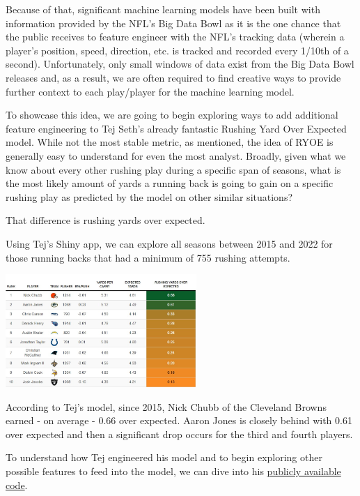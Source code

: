 \documentclass[
  letterpaper,
]{krantz}
\begin{document}
Because of that, significant machine learning models have been built
with information provided by the NFL's Big Data Bowl as it is the one
chance that the public receives to feature engineer with the NFL's
tracking data (wherein a player's position, speed, direction, etc. is
tracked and recorded every 1/10th of a second). Unfortunately, only
small windows of data exist from the Big Data Bowl releases and, as a
result, we are often required to find creative ways to provide further
context to each play/player for the machine learning model.

To showcase this idea, we are going to begin exploring ways to add
additional feature engineering to Tej Seth's already fantastic Rushing
Yard Over Expected model. While not the most stable metric, as
mentioned, the idea of RYOE is generally easy to understand for even the
most analyst. Broadly, given what we know about every other rushing play
during a specific span of seasons, what is the most likely amount of
yards a running back is going to gain on a specific rushing play as
predicted by the model on other similar situations?

That difference is rushing yards over expected.

Using Tej's Shiny app, we can explore all seasons between 2015 and 2022
for those running backs that had a minimum of 755 rushing attempts.

\includegraphics[width=2.85in,height=\textheight]{images/ryoe_2015_2022.jpg}

According to Tej's model, since 2015, Nick Chubb of the Cleveland Browns
earned - on average - 0.66 over expected. Aaron Jones is closely behind
with 0.61 over expected and then a significant drop occurs for the third
and fourth players.

To understand how Tej engineered his model and to begin exploring other
possible features to feed into the model, we can dive into his
\href{https://github.com/tejseth/RYOE/blob/main/ryoe-2.R}{publicly
available code}.
\end{document}

